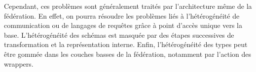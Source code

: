Cependant, ces problèmes sont généralement traités par l’architecture même de la fédération. En effet, on pourra résoudre les problèmes liés à l’hétérogénéité de communication ou de langages de requêtes grâce à point d’accès unique vers la base. L’hétérogénéité des schémas est masquée par des étapes successives de transformation et la représentation interne. Enfin, l’hétérogénéité des types peut être gommée dans les couches basses de la fédération, notamment par l’action des wrappers.


